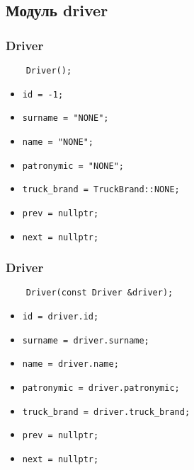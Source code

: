 \subsection{Модуль driver}

\subsubsection{Driver}

\begin{lstlisting}
    Driver();
\end{lstlisting}

\begin{itemize}
    \item \verb|id = -1;|
    \item \verb|surname = "NONE";|
    \item \verb|name = "NONE";|
    \item \verb|patronymic = "NONE";|
    \item \verb|truck_brand = TruckBrand::NONE;|
    \item \verb|prev = nullptr;|
    \item \verb|next = nullptr;|
\end{itemize}

\subsubsection{Driver}

\begin{lstlisting}
    Driver(const Driver &driver);
\end{lstlisting}

\begin{itemize}
    \item \verb|id = driver.id;|
    \item \verb|surname = driver.surname;|
    \item \verb|name = driver.name;|
    \item \verb|patronymic = driver.patronymic;|
    \item \verb|truck_brand = driver.truck_brand;|
    \item \verb|prev = nullptr;|
    \item \verb|next = nullptr;|
\end{itemize}

